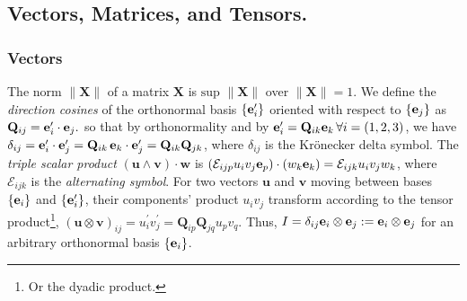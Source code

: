 \subsection{Vectors, Matrices, and Tensors.}
%
\subsubsection{Vectors} The norm $\|\mathbf{X}\|$ of a matrix $\mathbf{X}$ is $\text{sup } \|\mathbf{X}\|$ over $\|\mathbf{X}\|=1$.   We define the \textit{direction cosines} of the orthonormal basis $\{\mathbf{e}_i^\prime\}$ oriented with respect to $\{\mathbf{\mathbf{e}}_j\}$ as $ \mathbf{Q}_{ij} = \mathbf{\mathbf{e}}_i^\prime \cdot \mathbf{\mathbf{e}}_j.$
%
%
so that by orthonormality and by $\mathbf{e}_i^\prime = \mathbf{Q}_{ik} \mathbf{e}_k \, \forall i=(1, 2, 3)$, we have  $\delta_{ij} = \mathbf{e}_i^\prime \cdot \mathbf{e}_j^\prime = \mathbf{Q}_{ik} \, \mathbf{e}_k \cdot \mathbf{e}_j^\prime = \mathbf{Q}_{ik} \mathbf{Q}_{jk}$, where $\delta_{ij}$ is the Kr\"{o}necker delta symbol.
%
%
%
The \textit{triple scalar product}  $\left( \mathbf{u} \wedge \mathbf{v} \right) \cdot \mathbf{w}$ is $\left(\mathcal{E}_{ijp} u_i v_j \mathbf{e}_p \right) \cdot \left( w_k \mathbf{e}_k \right) = \mathcal{E}_{ijk} u_i v_j w_k$, where $\mathcal{E}_{ijk}$ is the \textit{alternating symbol}.
%
%
For two vectors $\mathbf{u}$ and $\mathbf{v}$ moving between bases $\{\mathbf{e}_i\}$ and $\{\mathbf{e}_i^\prime\}$, their components' product $u_i v_j$ transform according to the tensor product\footnote{Or the dyadic product.}, $(\mathbf{u} \otimes \mathbf{v})_{ij} = u_i^\prime v_j^\prime = \mathbf{Q}_{ip} \mathbf{Q}_{jq} u_p v_q$. Thus, $I = \delta_{ij} \mathbf{e}_i \otimes \mathbf{e}_j:= \mathbf{e}_i \otimes \mathbf{e}_j$ for an arbitrary orthonormal basis $\{\mathbf{e}_i \}$.
